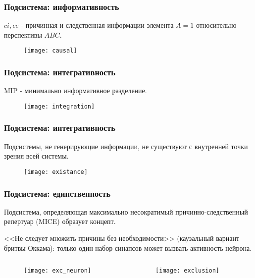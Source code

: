 \documentclass[default]{beamer}
\begin{document}
	\begin{frame}
		\frametitle{Подсистема: информативность}
		
		$ci,ce$ - причинная и следственная информации элемента $A=1$ относительно перспективы $ABC$.
		
		\begin{figure}
			\texttt{[image: causal]}
		\end{figure}
	\end{frame}

	\begin{frame}
		\frametitle{Подсистема: интегративность}
		MIP - минимально информативное разделение.
		\begin{figure}
			\texttt{[image: integration]}
		\end{figure}
	\end{frame}

	\begin{frame}
		\frametitle{Подсистема: интегративность}
		Подсистемы, не генерирующие информации, не существуют с внутренней точки зрения всей системы.
		\begin{figure}
			\texttt{[image: existance]}
		\end{figure}
	\end{frame}

	\begin{frame}
		\frametitle{Подсистема: единственность}
		
		Подсистема, определяющая максимально несократимый причинно-следственный репертуар (MICE) образует концепт.
		\par\bigskip
		<<Не следует множить причины без необходимости>> (каузальный вариант бритвы Оккама): только один набор синапсов может вызвать активность нейрона.
		
		\begin{columns}
			\begin{column}{0.5\textwidth}
				\begin{figure}
					\texttt{[image: exc\_neuron]}
				\end{figure}				
			\end{column}
			\begin{column}{0.5\textwidth}
				\begin{figure}
					\texttt{[image: exclusion]}
				\end{figure}
			\end{column}
		\end{columns}

	\end{frame}
\end{document}
